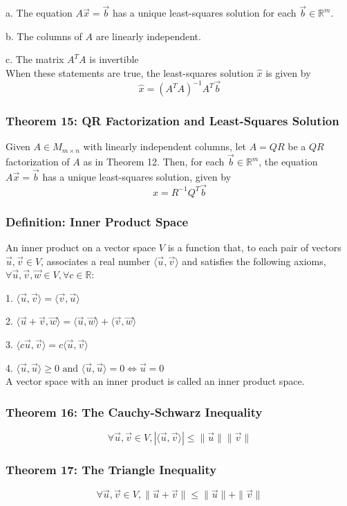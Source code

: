 \documentclass{article}
\begin{document}
a. The equation $A \vec x = \vec b$ has a unique least-squares solution for each $\vec b \in \mathbb R^m$.

b. The columns of $A$ are linearly independent.

c. The matrix $A^T A$ is invertible \\
When these statements are true, the least-squares solution $\hat x$ is given by 
$$\hat x = (A^T A)^{-1} A^T \vec b$$

\subsubsection*{Theorem 15: QR Factorization and Least-Squares Solution}
Given $A \in M_{m \times n}$ with linearly independent columns, let $A = QR$ be a $QR$ factorization of $A$ as in Theorem 12. Then, for each $\vec b \in \mathbb R^m$, the equation $A \vec x = \vec b$ has a unique least-squares solution, given by
$$\hat x = R^{-1} Q^T \vec b$$

\subsubsection*{Definition: Inner Product Space}
An inner product on a vector space $V$ is a function that, to each pair of vectors $\vec u, \vec v \in V$, associates a real number $\langle \vec u, \vec v \rangle$ and satisfies the following axioms, $\forall \vec u, \vec v, \vec w \in V, \forall c \in \mathbb R$:

1. $\langle \vec u, \vec v \rangle = \langle \vec v, \vec u \rangle$

2. $\langle \vec u + \vec v , \vec w \rangle = \langle \vec u, \vec w \rangle + \langle \vec v, \vec w \rangle$

3. $\langle c \vec u , \vec v \rangle = c\langle \vec u , \vec v \rangle$

4. $\langle \vec u , \vec u \rangle \geq 0 \text{ and } \langle \vec u, \vec u \rangle = 0 \iff \vec u = 0$
\\A vector space with an inner product is called an inner product space. 

\subsubsection*{Theorem 16: The Cauchy-Schwarz Inequality}
$$\forall \vec u, \vec v \in V, |\langle \vec u, \vec v \rangle | \leq \|\vec u \| \|\vec v \|$$

\subsubsection*{Theorem 17: The Triangle Inequality}
$$\forall \vec u, \vec v \in V, \| \vec u + \vec v \| \leq \| \vec u \| + \| \vec v \|$$
\end{document}
